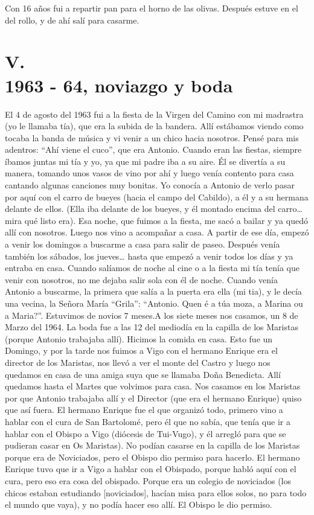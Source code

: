 \documentclass[12pt,a5paper]{book}
\begin{document}
Con 16 años fui a repartir pan para el horno de las olivas. Después estuve en el del rollo, y de ahí salí para casarme.



\section*{V.\\1963 - 64, noviazgo y boda}


El 4 de agosto del 1963 fui a la fiesta de la Virgen del Camino con mi madrastra (yo le llamaba tía), que era la subida de la bandera. Allí estábamos viendo como tocaba la banda de música y vi venir a un chico hacia nosotros. Pensé para mis adentros: “Ahí viene el cuco”, que era Antonio.
Cuando eran las fiestas, siempre íbamos juntas mi tía y yo, ya que mi padre iba a su aire. Él se divertía a su manera, tomando unos vasos de vino por ahí y luego venía contento para casa cantando algunas canciones muy bonitas.
Yo conocía a Antonio de verlo pasar por aquí con el carro de bueyes (hacia el campo del Cabildo), a él y a su hermana delante de ellos. (Ella iba delante de los bueyes, y él montado encima del carro… mira qué listo era).
Esa noche, que fuimos a la fiesta, me sacó a bailar y ya quedó allí con nosotros. Luego nos vino a acompañar a casa. A partir de ese día, empezó a venir los domingos a buscarme a casa para salir de paseo. Después venía también los sábados, los jueves… hasta que empezó a venir todos los días y ya entraba en casa.
Cuando salíamos de noche al cine o a la fiesta mi tía tenía que venir con nosotros, no me dejaba salir sola con él de noche. Cuando venía Antonio a buscarme, la primera que salía a la puerta era ella (mi tia), y le decía una vecina, la Señora María “Grila”: “Antonio. Quen é a túa moza, a Marina ou a Maria?”.
Estuvimos de novios 7 meses.A los siete meses nos casamos, un 8 de Marzo del 1964. La boda fue a las 12 del mediodía en la capilla de los Maristas (porque Antonio trabajaba allí). Hicimos la comida en casa. Esto fue un Domingo, y por la tarde nos fuimos a Vigo con el hermano Enrique era el director de los Maristas, nos llevó a ver el monte del Castro y luego nos quedamos en casa de una amiga suya que se llamaba Doña Benedicta. Allí quedamos hasta el Martes que volvimos para casa. Nos casamos en los Maristas por que Antonio trabajaba allí y el Director (que era el hermano Enrique) quiso que así fuera. El hermano Enrique fue el que organizó todo, primero vino a hablar con el cura de San Bartolomé, pero él que no sabía, que tenía que ir a hablar con el Obispo a Vigo (diócesis de Tui-Vugo), y él arregló para que se pudieran casar en Os Maristas). No podían casarse en la capilla de los Maristas porque era de Noviciados, pero el Obispo dio permiso para hacerlo.
El hermano Enrique tuvo que ir a Vigo a hablar con el Obispado, porque habló aquí con el cura, pero eso era cosa del obispado. Porque era un colegio de noviciados (los chicos estaban estudiando [noviciados], hacían misa para ellos solos, no para todo el mundo que vaya), y no podía hacer eso allí. El Obispo le dio permiso.
\end{document}
